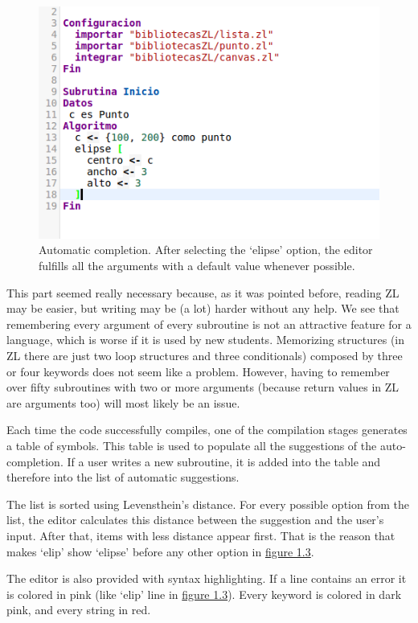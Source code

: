 \documentclass{report}
\begin{document}
\begin{figure}
\centering
\includegraphics[width=0.7\linewidth]{aftercompletion}
\caption[Automatic completion]{Automatic completion. After selecting the `elipse' option, the editor fulfills all the arguments with a default value whenever possible.}
\label{fig:aftercompletion}
\end{figure}

	This part seemed really necessary because, as it was pointed before, reading ZL may be easier, but writing may be (a lot) harder without any help. We see that remembering every argument of every subroutine is not an attractive feature for a language, which is worse if it is used by new students. Memorizing structures (in ZL there are just two loop structures and three conditionals) composed by three or four keywords does not seem like a problem. However, having to remember over fifty subroutines with two or more arguments (because return values in ZL are arguments too) will most likely be an issue. 
	
	Each time the code successfully compiles, one of the compilation stages generates a table of symbols. This table is used to populate all the suggestions of the auto-completion. If a user writes a new subroutine, it is added into the table and therefore into the list of automatic suggestions.
	
	The list is sorted using Levensthein's distance\cite{levensthein}. For every possible option from the list, the editor calculates this distance between the suggestion and the user's input. After that, items with less distance appear first. That is the reason that makes `elip' show `elipse' before any other option in \hyperref[fig:beforecompletion]{figure 1.3}.
	
	The editor is also provided with syntax highlighting. If a line contains an error it is colored in pink (like `elip' line in \hyperref[fig:beforecompletion]{figure 1.3}). Every keyword is colored in dark pink, and every string in red. 
	
\end{document}
